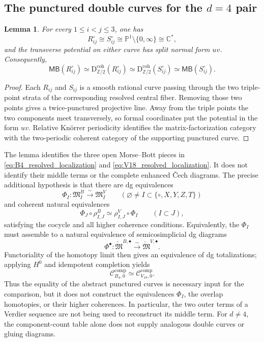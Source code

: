 \documentclass[11pt]{amsart}
\newtheorem{lemma}[theorem]{Lemma}
\theoremstyle{definition}
\theoremstyle{remark}
\newcommand{\Dtwo}{\mathrm{D}^{\mathrm{coh}}_{\mathbb Z/2}}
\newcommand{\MBcat}[1]{\mathsf{MB}(#1)}
\newcommand{\CcompB}{\mathcal C^{\mathrm{comp}}_{B_4,0}}
\newcommand{\CcompV}{\mathcal C^{\mathrm{comp}}_{V_{18},0}}
\begin{document}
\subsection{The punctured double curves for the \texorpdfstring{$d=4$}{d=4} pair}

\begin{lemma}
\label{lem:punctured_double_curves}
For every $1\leq i<j\leq3$, one has
\[
R_{ij}^{\circ}
\cong
S_{ij}^{\circ}
\cong
\mathbb P^1\setminus\{0,\infty\}
\cong
\mathbb C^*,
\]
and the transverse potential on either curve has split normal form $uv$.
Consequently,
\[
\MBcat{R_{ij}^{\circ}}
\simeq
\Dtwo(R_{ij}^{\circ})
\simeq
\Dtwo(S_{ij}^{\circ})
\simeq
\MBcat{S_{ij}^{\circ}}.
\]
\end{lemma}

\begin{proof}
Each $R_{ij}$ and $S_{ij}$ is a smooth rational curve passing through the two
triple-point strata of the corresponding resolved central fiber.  Removing
those two points gives a twice-punctured projective line.  Away from the
triple points the two components meet transversely, so formal coordinates put
the potential in the form $uv$.  Relative Knörrer periodicity identifies the
matrix-factorization category with the two-periodic coherent category of the
supporting punctured curve.
\end{proof}

The lemma identifies the three open Morse--Bott pieces in
\eqref{eq:B4_resolved_localization} and
\eqref{eq:V18_resolved_localization}.  It does not identify their middle
terms or the complete enhanced Čech diagrams.  The precise additional
hypothesis is that there are dg equivalences
\[
\Phi_I:\mathfrak M^B_I\xrightarrow{\sim}\mathfrak M^V_I
\qquad
(\varnothing\neq I\subset\{\circ,X,Y,Z,T\})
\]
and coherent natural equivalences
\begin{equation}
\label{eq:d4_restriction_compatibility}
\Phi_J\circ\rho^B_{I,J}
\simeq
\rho^V_{I,J}\circ\Phi_I
\qquad(I\subset J),
\end{equation}
satisfying the cocycle and all higher coherence conditions.  Equivalently,
the $\Phi_I$ must assemble to a natural equivalence of semicosimplicial dg
diagrams
\[
\Phi^\bullet:
\check{\mathfrak M}^{B,\bullet}
\xrightarrow{\sim}
\check{\mathfrak M}^{V,\bullet}.
\]
Functoriality of the homotopy limit then gives an equivalence of dg
totalizations; applying $H^0$ and idempotent completion yields
\begin{equation}
\label{eq:d4_compatible_gluing}
\CcompB\simeq\CcompV.
\end{equation}
Thus the equality of the abstract punctured curves is necessary input for the
comparison, but it does not construct the equivalences $\Phi_I$, the overlap
homotopies, or their higher coherences.  In particular, the two outer terms
of a Verdier sequence are not being used to reconstruct its middle term.
For $d\neq4$, the component-count table alone does not supply analogous
double curves or gluing diagrams.
\end{document}
